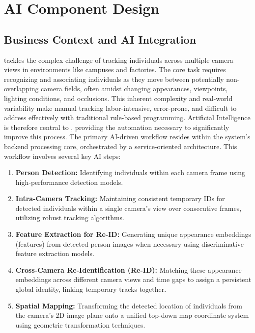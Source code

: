 \chapter{AI Component Design}
\label{chap:ai-component-design} %

\section{Business Context and AI Integration}
\label{section:business_context} %
\usevar{\srsTitle} tackles the complex challenge of tracking individuals across multiple camera views in environments like campuses and factories. The core task requires recognizing and associating individuals as they move between potentially non-overlapping camera fields, often amidst changing appearances, viewpoints, lighting conditions, and occlusions. This inherent complexity and real-world variability make manual tracking labor-intensive, error-prone, and difficult to address effectively with traditional rule-based programming. Artificial Intelligence is therefore central to \usevar{\srsTitle}, providing the automation necessary to significantly improve this process.
The primary AI-driven workflow resides within the system's backend processing core, orchestrated by a service-oriented architecture. This workflow involves several key AI steps:
\begin{enumerate}
    \item \textbf{Person Detection:} Identifying individuals within each camera frame using high-performance detection models.
    \item \textbf{Intra-Camera Tracking:} Maintaining consistent temporary IDs for detected individuals within a single camera's view over consecutive frames, utilizing robust tracking algorithms.
    \item \textbf{Feature Extraction for Re-ID:} Generating unique appearance embeddings (features) from detected person images when necessary using discriminative feature extraction models.
    \item \textbf{Cross-Camera Re-Identification (Re-ID):} Matching these appearance embeddings across different camera views and time gaps to assign a persistent global identity, linking temporary tracks together.
    \item \textbf{Spatial Mapping:} Transforming the detected location of individuals from the camera's 2D image plane onto a unified top-down map coordinate system using geometric transformation techniques.
\end{enumerate}
